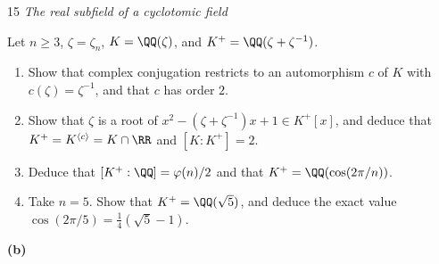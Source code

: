 \documentclass[11pt]{article}
\begin{document}
\begin{problem}{15}
  \textit{The real subfield of a cyclotomic field}\par
  Let $n\ge3$, $\zeta=\zeta_n$, $K=\QQ(\zeta)$, and $K^+=\QQ(\zeta+\zeta^{-1})$.
  \begin{enumerate}[label=(\alph*)]
    \item Show that complex conjugation restricts to an automorphism $c$ of $K$ with $c(\zeta)=\zeta^{-1}$, and that $c$ has order $2$.
    \item Show that $\zeta$ is a root of $x^2-(\zeta+\zeta^{-1})x+1\in K^+[x]$, and deduce that $K^+=K^{\langle c\rangle}=K\cap\RR$ and $[K:K^+]=2$.
    \item Deduce that $[K^+:\QQ]=\varphi(n)/2$ and that $K^+=\QQ(\cos(2\pi/n))$.
    \item Take $n=5$. Show that $K^+=\QQ(\sqrt5)$, and deduce the exact value $\cos(2\pi/5)=\tfrac14(\sqrt5-1)$.
  \end{enumerate}
\end{problem}
\noindent\textbf{(b)}
\end{document}
